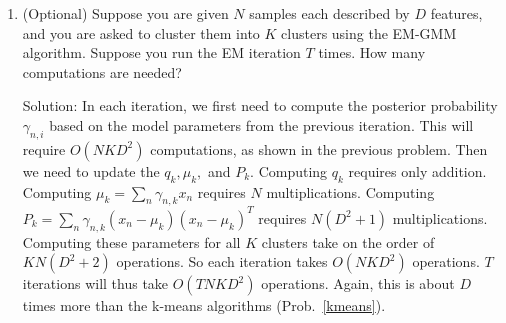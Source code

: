 \documentclass[11pt]{article}
\begin{document}
\begin{enumerate}
 
 
 \item (Optional)
Suppose you are given $N$ samples each described by $D$ features, and you are asked to cluster them into $K$ clusters using the EM-GMM algorithm. Suppose you run the EM  iteration $T$ times. How many computations are needed? 



Solution: In each iteration, we first need to  compute the posterior probability $\gamma_{n,i}$ based on the model parameters from the previous iteration. This will require  $O(NKD^2)$ computations, as shown in the previous problem. Then we need to update the $q_k, \mu_k,$ and $P_k$. Computing $q_k$ requires only addition. Computing $\mu_k= \sum_{n} \gamma_{n,k} x_n $ requires $N$ multiplications. Computing $P_k=\sum_n \gamma_{n,k} (x_n-\mu_k) (x_n-\mu_k)^{T}$ requires $N (D^2+1)$ multiplications. Computing these parameters for all $K$ clusters take on the order of $ K N (D^2+2)$ operations. So each iteration takes  $O(NKD^2)$ operations. $T$ iterations will thus take $O(TNKD^2)$ operations. Again, this is about $D$ times more than the k-means algorithms (Prob.~\ref{kmeans}).

\end{enumerate}
  
\end{document}
